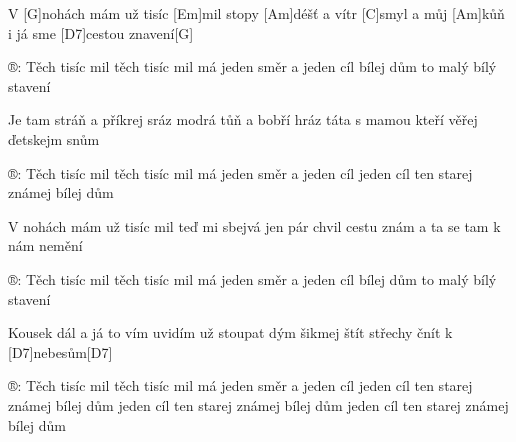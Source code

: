 
V [G]nohách mám už tisíc [Em]mil
stopy [Am]déšť a vítr [C]smyl
a můj [Am]kůň i já sme [D7]cestou znavení[G]

®: Těch tisíc mil těch tisíc mil
má jeden směr a jeden cíl
bílej dům to malý bílý stavení

Je tam stráň a příkrej sráz
modrá tůň a bobří hráz
táta s mamou kteří věřej ďetskejm snům

®: Těch tisíc mil těch tisíc mil
má jeden směr a jeden cíl
jeden cíl ten starej známej bílej dům

V nohách mám už tisíc mil
teď mi sbejvá jen pár chvil
cestu znám a ta se tam k nám nemění

®: Těch tisíc mil těch tisíc mil
má jeden směr a jeden cíl
bílej dům to malý bílý stavení

Kousek dál a já to vím uvidím už stoupat dým
šikmej štít střechy čnít k [D7]nebesům[D7] 

®: Těch tisíc mil těch tisíc mil
má jeden směr a jeden cíl
jeden cíl ten starej známej bílej dům
jeden cíl ten starej známej bílej dům
jeden cíl ten starej známej bílej dům 
